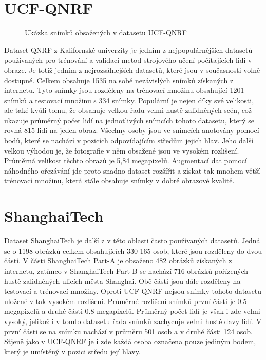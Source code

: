 \section{UCF-QNRF}
\begin{figure}[h!]
	\centering
	\caption{Ukázka snímků obsažených v datasetu UCF-QNRF \cite{QNRF}}
	\label{fig:RNN_architecture}
\end{figure}

Dataset QNRF \cite{QNRF} z Kalifornské univerzity je jedním z nejpopulárnějších datasetů používaných pro trénování a validaci metod strojového učení počítajících lidi v obraze.
Je totiž jedním z nejrozsáhlejších datasetů, které jsou v současnosti volně dostupné.
Celkem obsahuje 1535 na sobě nezávislých snímků získaných z internetu.
Tyto snímky jsou rozděleny na trénovací množinu obsahující 1201 snímků a testovací množinu s 334 snímky.
Populární je nejen díky své velikosti, ale také kvůli tomu, že obsahuje velkou řadu velmi hustě zalidněných scén, což ukazuje průměrný počet lidí na jednotlivých snímcích tohoto datasetu, který se rovná 815 lidí na jeden obraz.
Všechny osoby jsou ve snímcích anotovány pomocí bodů, které se nachází v pozicích odpovídajícím středům jejich hlav.
Jeho další velkou výhodou je, že fotografie v něm obsažené jsou ve vysokém rozlišení.
Průměrná velikost těchto obrazů je 5,84 megapixelů.
Augmentací dat pomocí náhodného ořezávání jde proto snadno dataset rozšířit a získat tak mnohem větší trénovací množinu, která stále obsahuje snímky v dobré obrazové kvalitě.


\section{ShanghaiTech}
Dataset ShanghaiTech \cite{ShanghaiTech} je další z v této oblasti často používaných datasetů.
Jedná se o 1198 obrázků celkem obsahujících 330 165 osob, které jsou rozděleny do dvou částí.
V části ShanghaiTech Part-A je obsaženo 482 obrázků získaných z internetu, zatímco v ShanghaiTech Part-B se nachází 716 obrázků pořízených hustě zalidněných ulicích města Shanghai. Obě části jsou dále rozděleny na testovací a trénovací množiny.
Oproti UCF-QNRF nejsou snímky tohoto datasetu uložené v tak vysokém rozlišení. Průměrné rozlišení snímků první části je 0.5 megapixelů a druhé části 0.8 megapixelů.
Průměrný počet lidí je však i zde velmi vysoký, jelikož i v tomto datasetu řada snímků zachycuje velmi husté davy lidí. V první části se na snímku nachází v průměru 501 osob a v druhé části 124 osob.
Stjeně jako v UCF-QNRF je i zde každá osoba označena pouze jediným bodem, který je umístěný v pozici středu její hlavy.

